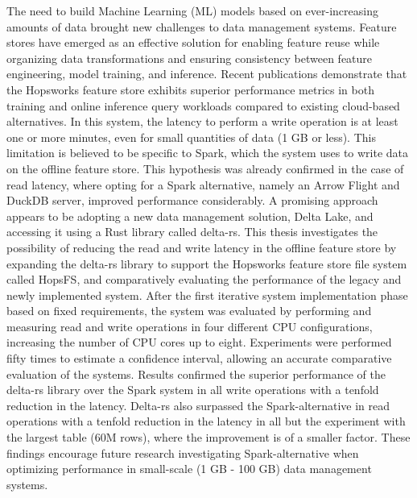 \begin{scontents}[store-env=abstracts,print-env=true]
The need to build Machine Learning (ML) models based on ever-increasing amounts of data brought new challenges to data management systems. Feature stores have emerged as an effective solution for enabling feature reuse while organizing data transformations and ensuring consistency between feature engineering, model training, and inference. Recent publications demonstrate that the Hopsworks feature store exhibits superior performance metrics in both training and online inference query workloads compared to existing cloud-based alternatives. In this system, the latency to perform a write operation is at least one or more minutes, even for small quantities of data (1 GB or less). This limitation is believed to be specific to Spark, which the system uses to write data on the offline feature store. This hypothesis was already confirmed in the case of read latency, where opting for a Spark alternative, namely an Arrow Flight and DuckDB server, improved performance considerably. A promising approach appears to be adopting a new data management solution, Delta Lake, and accessing it using a Rust library called delta-rs. This thesis investigates the possibility of reducing the read and write latency in the offline feature store by expanding the delta-rs library to support the Hopsworks feature store file system called HopsFS, and comparatively evaluating the performance of the legacy and newly implemented system. After the first iterative system implementation phase based on fixed requirements, the system was evaluated by performing and measuring read and write operations in four different CPU configurations, increasing the number of CPU cores up to eight. Experiments were performed fifty times to estimate a confidence interval, allowing an accurate comparative evaluation of the systems. Results confirmed the superior performance of the delta-rs library over the Spark system in all write operations with a tenfold reduction in the latency. Delta-rs also surpassed the Spark-alternative in read operations with a tenfold reduction in the latency in all but the experiment with the largest table (60M rows), where the improvement is of a smaller factor. These findings encourage future research investigating Spark-alternative when optimizing performance in small-scale (1 GB - 100 GB) data management systems.
\end{scontents}
